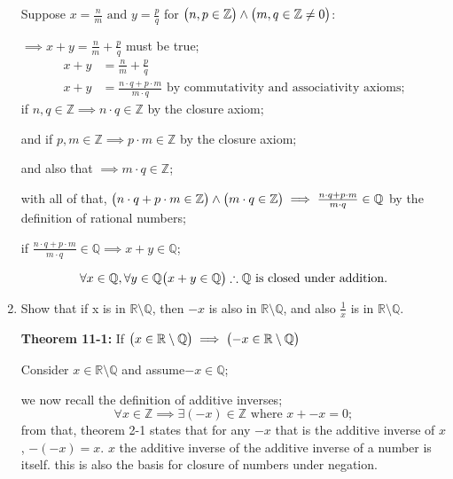 \documentclass{article}
\newcommand{\paren}[1]{\mathopen{}\left( {#1}_{{}_{}}\,\negthickspace\right)\mathclose{}} %
\begin{document}
\begin{enumerate}[start = 8, label = {\bfseries Problem \arabic*:}, leftmargin=1in]
    \vspace{1em}
    Suppose \(x = \frac{n}{m} \text{ and } y = \frac{p}{q}\) for \(\paren{n, p \in \mathbb{Z}} \land \paren{m, q 
    \in \mathbb{Z} \neq 0}\):

    \(\implies x + y = \frac{n}{m} + \frac{p}{q} \) must be true;
    \begin{align*}
            x + y &= \frac{n}{m} + \frac{p}{q} \\
            x + y &= \frac{n\cdot q + p\cdot m}{m\cdot q} \text{ by  commutativity and associativity axioms;}
    \end{align*}
    if \(n, q \in \mathbb{Z} \implies n \cdot q \in \mathbb{Z}\) by the closure axiom;
    
    and if \(p, m \in \mathbb{Z} \implies p \cdot m \in \mathbb{Z}\) by the closure axiom;

    and also that \(\implies m \cdot q \in \mathbb{Z}\);

    with all of that, \(\paren{n\cdot q + p\cdot m \in \mathbb{Z}} \land \paren{m\cdot q \in \mathbb{Z}} \implies 
    \frac{n\cdot q + p\cdot m}{m\cdot q} \in \mathbb{Q}\) by the definition of rational numbers;
    
    if \(\frac{n\cdot q + p\cdot m}{m\cdot q} \in \mathbb{Q} \implies x + y \in \mathbb{Q}\);
    
    \[
        \forall x \in \mathbb{Q}, \forall y \in \mathbb{Q} \paren{x + y \in \mathbb{Q}} \therefore 
        \mathbb{Q} \text{ is closed under addition.}
    \]

    \item Show that if x is in \(\mathbb{R} \setminus \mathbb{Q}\), then \(-x\) is also in \(\mathbb{R} \setminus \mathbb{Q}\), and also 
    \(\frac{1}{x}\) is in \(\mathbb{R} \setminus \mathbb{Q}\). 

    \vspace{1em}
    \textbf{Theorem 11-1:} If \(\paren{x \in \mathbb{R \setminus Q}} \implies \paren{-x \in \mathbb{R \setminus Q}}\) 

    Consider \(x \in \mathbb{R} \setminus \mathbb{Q}\) and assume\(-x \in \mathbb{Q}\);
    
    we now recall the definition of additive inverses; 
    \[
        \forall x \in \mathbb{Z} \implies \exists(-x) \in \mathbb{Z} \text{ where } x + -x = 0; 
    \]
    from that, theorem 2-1 states that for any \(-x\) that is the additive inverse of 
    \(x\), \(-(-x) = x\). \(x\) the additive inverse of the additive inverse of a number is itself.
    this is also the basis for closure of numbers under negation.


\end{enumerate}
\end{document}
